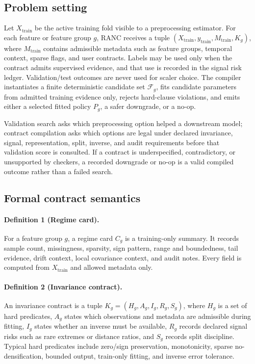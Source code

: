 \documentclass{article}
\begin{document}
\subsection{Problem setting}

Let $X_{\mathrm{train}}$ be the active training fold visible to a preprocessing
estimator. For each feature or feature group $g$, RANC receives a tuple
$(X_{\mathrm{train}}, y_{\mathrm{train}}, M_{\mathrm{train}}, K_g)$, where
$M_{\mathrm{train}}$ contains admissible metadata such as feature groups,
temporal context, sparse flags, and user contracts. Labels may be used only when
the contract admits supervised evidence, and that use is recorded in the signal
risk ledger. Validation/test outcomes are never used for scaler choice. The
compiler instantiates a finite deterministic candidate set
$\mathcal{F}_g$, fits candidate parameters from admitted training evidence only,
rejects hard-clause violations, and emits either a selected fitted policy
$P_g$, a safer downgrade, or a no-op.

Validation search asks which preprocessing option helped a downstream model;
contract compilation asks which options are legal under declared invariance,
signal, representation, split, inverse, and audit requirements before that
validation score is consulted. If a contract is underspecified, contradictory,
or unsupported by checkers, a recorded downgrade or no-op is a valid compiled
outcome rather than a failed search.

\subsection{Formal contract semantics}

\paragraph{Definition 1 (Regime card).}
For a feature group $g$, a regime card $C_g$ is a training-only summary. It
records sample count, missingness, sparsity, sign pattern, range and boundedness,
tail evidence, drift context, local covariance context, and audit notes. Every
field is computed from $X_{\mathrm{train}}$ and allowed metadata only.

\paragraph{Definition 2 (Invariance contract).}
An invariance contract is a tuple $K_g=(H_g,A_g,I_g,R_g,S_g)$, where $H_g$ is a
set of hard predicates, $A_g$ states which observations and metadata are
admissible during fitting, $I_g$ states whether an inverse must be available,
$R_g$ records declared signal risks such as rare extremes or distance ratios,
and $S_g$ records split discipline. Typical hard predicates include zero/sign
preservation, monotonicity, sparse no-densification, bounded output, train-only
fitting, and inverse error tolerance.
\end{document}
